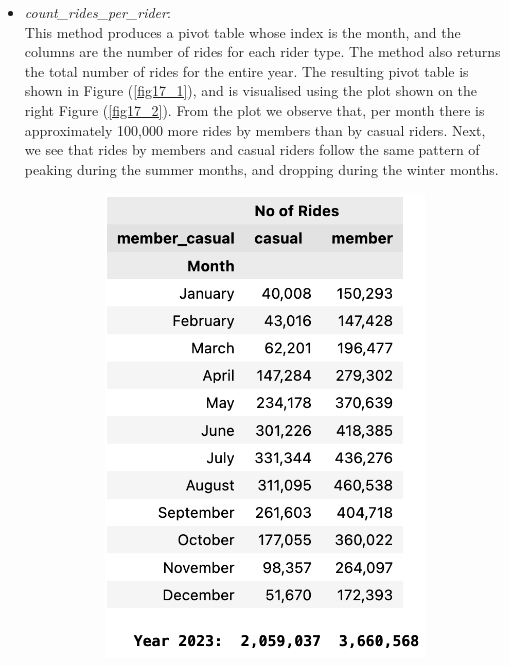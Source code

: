 \documentclass[12pt]{article}
\begin{document}
 \begin{itemize}
	\item \textit{count\_rides\_per\_rider}:\\
	This method produces a pivot table whose index is the month, and the columns are the number of rides for each rider type. The method also returns the total number of rides for the entire year. The resulting pivot table is shown in Figure (\ref{fig17_1}), and is visualised using the plot shown on the right Figure (\ref{fig17_2}). From the plot we observe that, per month there is approximately 100,000 more rides by members than by casual riders. Next, we see that rides by members and casual riders follow the same pattern of peaking during the summer months, and dropping during the winter months. 

	\begin{figure}[h]
	\hspace{0.8in}
	\begin{subfigure}{.2\textwidth}
		\includegraphics[scale=0.55]{img4.png} 

\end{subfigure}
\end{figure}
\end{itemize}
\end{document}
